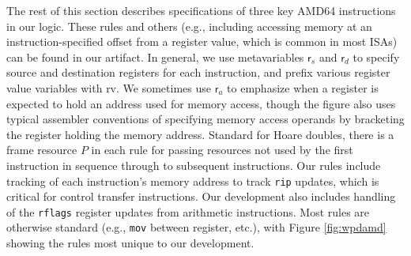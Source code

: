 The rest of this section describes specifications of three key \textsf{AMD64} instructions 
in our logic. 
These rules and others (e.g., including accessing memory at an instruction-specified offset from a register
value, which is common in most ISAs)
can be found in our artifact.
In general, we use metavariables $\textsf{r}_s$ and $\textsf{r}_d$ to specify source and destination registers
for each instruction, and prefix various register value variables with \textsf{rv}.
We sometimes use $\textsf{r}_a$ to emphasize when a register is expected to hold an address used
for memory access, though the figure also uses typical assembler conventions of specifying
memory access operands by bracketing the register holding the memory address.
Standard for Hoare doubles, there is a frame resource $P$ in each rule for passing resources
not used by the first instruction in sequence through to subsequent instructions.
Our rules include tracking of each instruction's memory address to track \lstinline|rip| updates, which is critical
for control transfer instructions. Our development also includes handling of the \lstinline|rflags| register updates from arithmetic instructions.
Most rules are otherwise standard (e.g., \lstinline|mov| between register, etc.), with Figure \ref{fig:wpdamd} showing the rules
most unique to our development.

